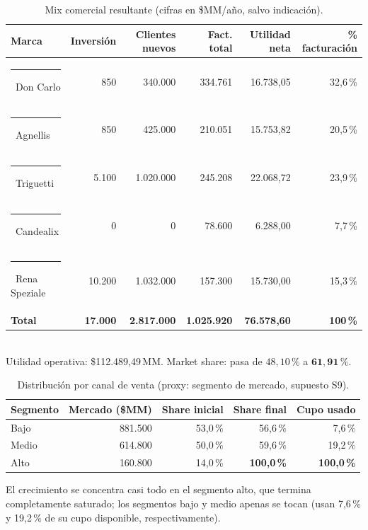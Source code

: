 \documentclass[10pt,a4paper]{article}
\newcommand{\marca}[2]{\textcolor{#1}{\rule{0.28cm}{0.28cm}}~#2}
\begin{document}
\begin{table}[htbp]
\centering\small
\caption{Mix comercial resultante (cifras en \$MM/año, salvo indicación).}
\begin{tabular}{lrrrrr}
\toprule
Marca & Inversión & Clientes nuevos & Fact. total & Utilidad neta & \% facturación \\
\midrule
\marca{doncarlo}{Don Carlo}  & 850     & 340.000   & 334.761   & 16.738,05 & 32{,}6\,\% \\
\marca{agnellis}{Agnellis}   & 850     & 425.000   & 210.051   & 15.753,82 & 20{,}5\,\% \\
\marca{triguetti}{Triguetti} & 5.100   & 1.020.000 & 245.208   & 22.068,72 & 23{,}9\,\% \\
\marca{candealix}{Candealix} & 0       & 0         &  78.600   &  6.288,00 &  7{,}7\,\% \\
\marca{rena}{Rena Speziale}  & 10.200  & 1.032.000 & 157.300   & 15.730,00 & 15{,}3\,\% \\
\midrule
\textbf{Total} & \textbf{17.000} & \textbf{2.817.000} & \textbf{1.025.920} & \textbf{76.578,60} & \textbf{100\,\%} \\
\bottomrule
\end{tabular}
\vspace{1mm}\\
\footnotesize Utilidad operativa: \$112.489,49\,MM. Market share: pasa de $48{,}10\,\%$ a $\mathbf{61{,}91\,\%}$.
\end{table}

\begin{table}[htbp]
\centering\small
\caption{Distribución por canal de venta (proxy: segmento de mercado, supuesto S9).}
\begin{tabular}{lrrrr}
\toprule
Segmento & Mercado (\$MM) & Share inicial & Share final & Cupo usado \\
\midrule
Bajo  & 881.500 & 53{,}0\,\% & 56{,}6\,\%  &  7{,}6\,\% \\
Medio & 614.800 & 50{,}0\,\% & 59{,}6\,\%  & 19{,}2\,\% \\
Alto  & 160.800 & 14{,}0\,\% & \textbf{100{,}0\,\%} & \textbf{100{,}0\,\%} \\
\bottomrule
\end{tabular}
\end{table}

El crecimiento se concentra casi todo en el segmento alto, que termina
completamente saturado; los segmentos bajo y medio apenas se tocan (usan
7,6\,\% y 19,2\,\% de su cupo disponible, respectivamente).
\end{document}

